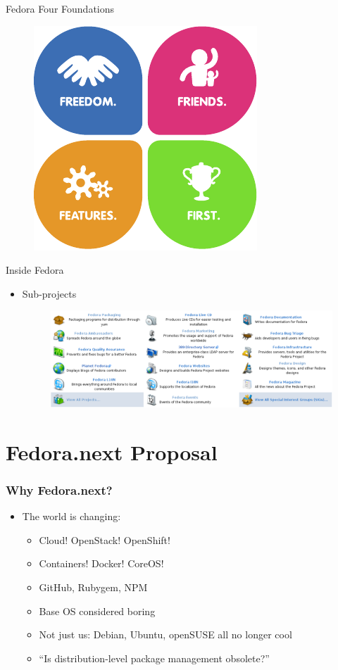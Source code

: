 \documentclass{beamer}
\begin{document}
\begin{frame}{Fedora Four Foundations}
  \begin{figure}[htbp]
    \centering
    \includegraphics[height=.7\textheight]{four_foundations.pdf}
  \end{figure}
\end{frame}

\begin{frame}{Inside Fedora}
  \begin{itemize}
    \item Sub-projects
      \begin{figure}[htbp]
        \centering
        \includegraphics[width=.9\textwidth]{subprojects.png}
      \end{figure}
  \end{itemize}
\end{frame}

\section{Fedora.next Proposal}
\begin{frame}
  \frametitle{Why Fedora.next?}
  \begin{itemize}
    \item The world is changing:
      \begin{itemize}
        \item Cloud! OpenStack! OpenShift!
        \item Containers! Docker! CoreOS!
        \item GitHub, Rubygem, NPM
        \item Base OS considered boring
        \item Not just us: Debian, Ubuntu, openSUSE all \alert{no
          longer cool}
        \item ``Is distribution-level package management obsolete?''
      \end{itemize}
  \end{itemize}
\end{frame}
\end{document}
